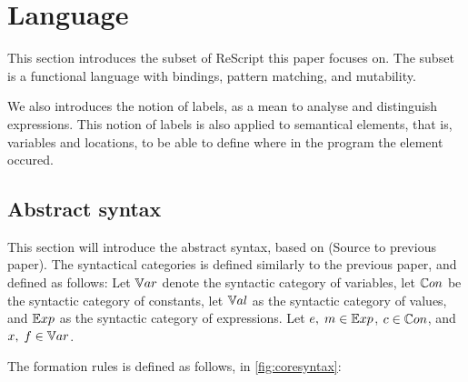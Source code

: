 \documentclass[../../master.tex]{subfiles}
\begin{document}
\section{Language}\label{sec:lang}
This section introduces the subset of ReScript this paper focuses on.
The subset is a functional language with bindings, pattern matching, and mutability.

We also introduces the notion of labels, as a mean to analyse and distinguish expressions.
This notion of labels is also applied to semantical elements, that is, variables and locations, to be able to define where in the program the element occured.

\subsection{Abstract syntax}
This section will introduce the abstract syntax, based on (Source to previous paper).
The syntactical categories is defined similarly to the previous paper, and defined as follows:
Let $\mathbb{V}ar$ denote the syntactic category of variables, let $\mathbb{C}on$ be the syntactic category of constants, let $\mathbb{V}al$ as the syntactic category of values, and $\mathbb{E}xp$ as the syntactic category of expressions. 
Let $e, \; m \in \mathbb{E}xp$, $c \in \mathbb{C}on$, and $x, \; f \in \mathbb{V}ar$.

The formation rules is defined as follows, in \cref{fig:coresyntax}:
\end{document}
